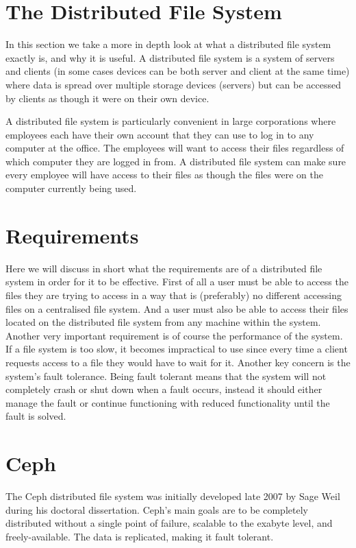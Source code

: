\documentclass[a4paper,12px]{article}
\begin{document}
\section{The Distributed File System}

In this section we take a more in depth look at what a distributed file system
exactly is, and why it is useful. A distributed file system is a system of
servers and clients (in some cases devices can be both server and client at the
same time) where data is spread over multiple storage devices (servers) but can
be accessed by clients as though it were on their own device.\cite{concepts}

A distributed file system is particularly convenient in large corporations where
employees each have their own account that they can use to log in to any
computer at the office. The employees will want to access their files regardless
of which computer they are logged in from. A distributed file system can make
sure every employee will have access to their files as though the files were on
the computer currently being used.

\section{Requirements}

Here we will discuss in short what the requirements are of a distributed file
system in order for it to be effective. First of all a user must be able to
access the files they are trying to access in a way that is (preferably) no
different accessing files on a centralised file system. And a user must also be
able to access their files located on the distributed file system from any
machine within the system.\cite{concepts} Another very important requirement is
of course the performance of the system. If a file system is too slow, it
becomes impractical to use since every time a client requests access to a file
they would have to wait for it. Another key concern is the system's fault
tolerance. Being fault tolerant means that the system will not completely crash
or shut down when a fault occurs, instead it should either manage the fault or
continue functioning with reduced functionality until the fault is
solved.\cite{concepts}

\section{Ceph}

The Ceph distributed file system \cite{weil2006ceph} was initially developed
late 2007 by Sage Weil during his doctoral dissertation. Ceph's main goals are
to be completely distributed without a single point of failure, scalable to the
exabyte level, and freely-available. The data is replicated, making it fault
tolerant.
\end{document}
